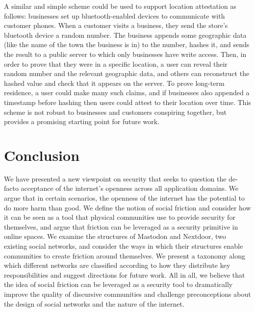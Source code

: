 \documentclass[sigconf,authordraft]{acmart}
\begin{document}
A similar and simple scheme could be used to support location attestation as follows: businesses set up bluetooth-enabled devices to communicate with customer phones. When a customer visits a business, they send the store's bluetooth device a random number. The business appends some geographic data (like the name of the town the business is in) to the number, hashes it, and sends the result to a public server to which only businesses have write access. Then, in order to prove that they were in a specific location, a user can reveal their random number and the relevant geographic data, and others can reconstruct the hashed value and check that it appears on the server. To prove long-term residence, a user could make many such claims, and if businesses also appended a timestamp before hashing then users could  attest to their location over time. This scheme is not robust to businesses and customers conspiring together, but provides a promising starting point for future work.  



\section{Conclusion}

We have presented a new viewpoint on security that seeks to  question the de-facto acceptance of the internet's openness across all application domains. We argue that in certain scenarios, the openness of the internet has the potential to do more harm than good. We define the notion of social friction and consider how it can be seen as a tool that physical communities use to provide security for themselves, and argue that friction can be leveraged as a security primitive in online spaces. We examine the structures of Mastodon and Nextdoor, two existing social networks, and consider the ways in which their structures enable communities to create friction around themselves. We present a taxonomy along which different networks are classified according to how they distribute key responsibilities and suggest directions for future work. All in all, we believe that the idea of social friction can be leveraged as a security tool to dramatically improve the quality of discursive communities and challenge preconceptions about the design of social networks and the nature of the internet. 

\fi




\end{document}
